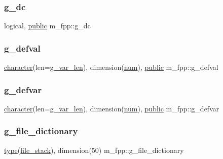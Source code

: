\subsubsection{\texorpdfstring{g\+\_\+dc}{g\_dc}}
{\footnotesize\ttfamily logical, \hyperlink{M__stopwatch_83_8txt_a2f74811300c361e53b430611a7d1769f}{public} m\+\_\+fpp\+::g\+\_\+dc}

\mbox{\label{namespacem__fpp_a1a99b8d1526c19ed196bc1c1ba53ba4c}} 
\subsubsection{\texorpdfstring{g\+\_\+defval}{g\_defval}}
{\footnotesize\ttfamily \hyperlink{option__stopwatch_83_8txt_abd4b21fbbd175834027b5224bfe97e66}{character}(len=\hyperlink{namespacem__fpp_a99c57ea4a304975a7afafcf0b292db06}{g\+\_\+var\+\_\+len}), dimension(\hyperlink{namespacem__fpp_adaa4b6694f65973ef728ad2189a8e6f2}{num}), \hyperlink{M__stopwatch_83_8txt_a2f74811300c361e53b430611a7d1769f}{public} m\+\_\+fpp\+::g\+\_\+defval}

\mbox{\label{namespacem__fpp_a07ee856eed5841b997794fe7c37bfed6}} 
\subsubsection{\texorpdfstring{g\+\_\+defvar}{g\_defvar}}
{\footnotesize\ttfamily \hyperlink{option__stopwatch_83_8txt_abd4b21fbbd175834027b5224bfe97e66}{character}(len=\hyperlink{namespacem__fpp_a99c57ea4a304975a7afafcf0b292db06}{g\+\_\+var\+\_\+len}), dimension(\hyperlink{namespacem__fpp_adaa4b6694f65973ef728ad2189a8e6f2}{num}), \hyperlink{M__stopwatch_83_8txt_a2f74811300c361e53b430611a7d1769f}{public} m\+\_\+fpp\+::g\+\_\+defvar}

\mbox{\label{namespacem__fpp_a4d652f22f13a938d8b879d2da436e3e7}} 
\subsubsection{\texorpdfstring{g\+\_\+file\+\_\+dictionary}{g\_file\_dictionary}}
{\footnotesize\ttfamily \hyperlink{stop__watch_83_8txt_a70f0ead91c32e25323c03265aa302c1c}{type}(\hyperlink{structm__fpp_1_1file__stack}{file\+\_\+stack}), dimension(50) m\+\_\+fpp\+::g\+\_\+file\+\_\+dictionary}

